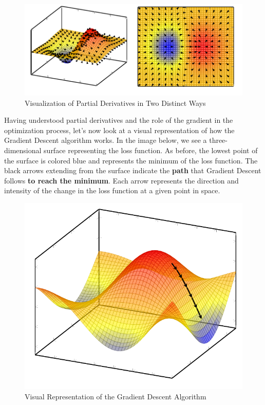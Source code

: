 \begin{figure}[!htbp]
    \centering
    \includegraphics[scale=2]{tikz/chapter2 - Partial Derivatives.pdf}
    \caption{Visualization of Partial Derivatives in Two Distinct Ways}
\end{figure}

Having understood partial derivatives and the role of the gradient in the optimization process, let's now look at a visual representation of how the Gradient Descent algorithm works. In the image below, we see a three-dimensional surface representing the loss function. As before, the lowest point of the surface is colored blue and represents the minimum of the loss function. The black arrows extending from the surface indicate the \textbf{path} that Gradient Descent follows \textbf{to reach the minimum}. Each arrow represents the direction and intensity of the change in the loss function at a given point in space.

\begin{figure}[!htbp]
    \centering
    \includegraphics[scale=0.75]{tikz/chapter2 - Gradient Descent.pdf}
    \caption{Visual Representation of the Gradient Descent Algorithm}
\end{figure}

